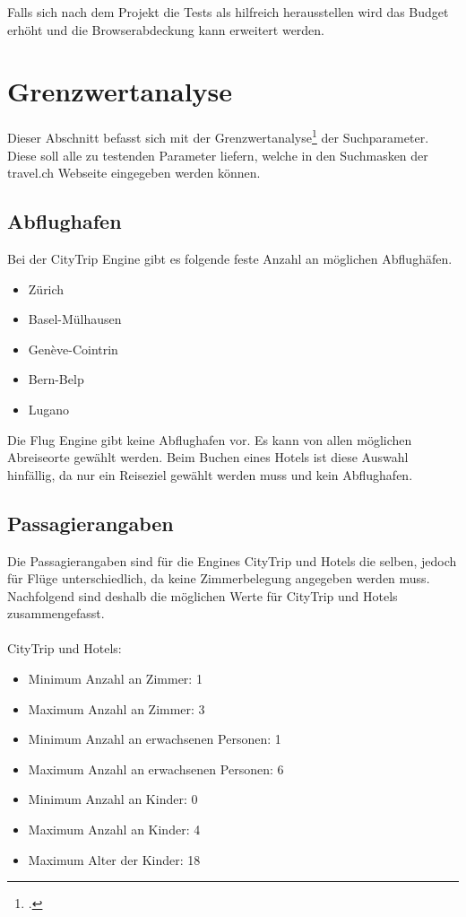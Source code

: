 Falls sich nach dem Projekt die Tests als hilfreich herausstellen wird das Budget erhöht und die Browserabdeckung kann erweitert werden.

\section{Grenzwertanalyse}
\label{sec:analyse:grenzwertanalyse}
Dieser Abschnitt befasst sich mit der Grenzwertanalyse\footcite{Dynamisches_Software-Testverfahren__Wikipedia_2015-10-25} der Suchparameter. Diese soll alle zu testenden Parameter liefern, welche in den Suchmasken der travel.ch Webseite eingegeben werden können.

\subsection{Abflughafen}
Bei der CityTrip Engine gibt es folgende feste Anzahl an möglichen Abflughäfen.
\begin{itemize}
\item Zürich
\item Basel-Mülhausen
\item Genève-Cointrin
\item Bern-Belp
\item Lugano
\end{itemize}

Die Flug Engine gibt keine Abflughafen vor. Es kann von allen möglichen Abreiseorte gewählt werden.
Beim Buchen eines Hotels ist diese Auswahl hinfällig, da nur ein Reiseziel gewählt werden muss und kein Abflughafen.

\subsection{Passagierangaben}
Die Passagierangaben sind für die Engines CityTrip und Hotels die selben, jedoch für Flüge unterschiedlich, da keine Zimmerbelegung angegeben werden muss. Nachfolgend sind deshalb die möglichen Werte für CityTrip und Hotels zusammengefasst.\\
\\  
\noindent CityTrip und Hotels:
\begin{itemize}
\item Minimum Anzahl an Zimmer: 1
\item Maximum Anzahl an Zimmer: 3
\item Minimum Anzahl an erwachsenen Personen: 1
\item Maximum Anzahl an erwachsenen Personen: 6
\item Minimum Anzahl an Kinder: 0
\item Maximum Anzahl an Kinder: 4
\item Maximum Alter der Kinder: 18
\end{itemize}


